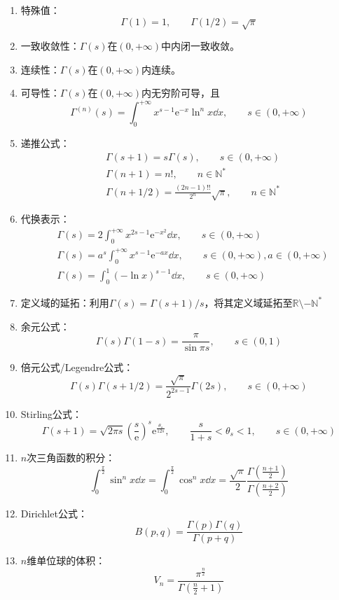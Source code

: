 \documentclass[lang = cn, scheme = chinese, thmcnt = section]{elegantbook}
\newcommand{\N}{\mathbb{N}}            %
\newcommand{\R}{\mathbb{R}}            %
\newcommand{\ee}[1]{\mathrm{e}^{#1}}
\begin{document}
\begin{theorem}
	\begin{enumerate}
		\item 特殊值：
		$$
		\Gamma(1)=1,\qquad 
		\Gamma(1/2)=\sqrt{\pi}
		$$
		\item 一致收敛性：$\Gamma(s)$在$(0,+\infty)$中内闭一致收敛。
		\item 连续性：$\Gamma(s)$在$(0,+\infty)$内连续。
		\item 可导性：$\Gamma(s)$在$(0,+\infty)$内无穷阶可导，且
		$$
		\Gamma^{(n)}(s)=\int_{0}^{+\infty}x^{s-1}\ee{-x}\ln^n x\dd x,\qquad s\in(0,+\infty)
		$$
		\item 递推公式：
		\begin{align*}
			& \Gamma(s+1)=s\Gamma(s),\qquad s\in(0,+\infty)\\
			& \Gamma(n+1)=n!,\qquad n\in\N^*\\
			& \Gamma(n+1/2)=\frac{(2n-1)!!}{2^n}\sqrt{\pi},\qquad n\in\N^*
		\end{align*}
		\item 代换表示：
		\begin{align*}
			& \Gamma(s)=2\int_{0}^{+\infty}x^{2s-1}\ee{-x^2}\dd x,\qquad s\in(0,+\infty)\\
			& \Gamma(s)=a^s\int_{0}^{+\infty}x^{s-1}\ee{-ax}\dd x,\qquad s\in(0,+\infty),a\in(0,+\infty)\\
			& \Gamma(s)=\int_{0}^{1}(-\ln x)^{s-1}\dd x,\qquad s\in(0,+\infty)
		\end{align*}
		\item 定义域的延拓：利用$\Gamma(s)=\Gamma(s+1)/s$，将其定义域延拓至$\R\setminus-\N^*$
		\item 余元公式：
		$$
		\Gamma(s)\Gamma(1-s)=\frac{\pi}{\sin \pi s},\qquad 
		s\in (0,1)
		$$
		\item 倍元公式/Legendre公式：
		$$
		\Gamma(s)\Gamma(s+1/2)
		=\frac{\sqrt{\pi}}{2^{2s-1}}\Gamma(2s),\qquad s\in(0,+\infty)
		$$
		\item Stirling公式：
		$$
		\Gamma(s+1)=\sqrt{2\pi s}\left(\frac{s}{\mathrm{e}}\right)^{s}\ee{\frac{\theta_s}{12s}},\qquad \frac{s}{1+s}<\theta_s<1,\qquad s\in(0,+\infty)
		$$
		\item $n$次三角函数的积分：
		$$
		\int_{0}^{\frac{\pi}{2}}\sin^n x\dd x
		=\int_{0}^{\frac{\pi}{2}}\cos^n x\dd x
		=\frac{\sqrt{\pi}}{2}\frac{\Gamma\left(\frac{n+1}{2}\right)}{\Gamma\left(\frac{n+2}{2}\right)}
		$$
		\item Dirichlet公式：
		$$
		B(p,q)=\frac{\Gamma(p)\Gamma(q)}{\Gamma(p+q)}
		$$
		\item $n$维单位球的体积：
		$$
		V_n=\frac{\pi^{\frac{n}{2}}}{\Gamma\left(\frac{n}{2}+1\right)}
		$$	
	\end{enumerate}
\end{theorem}
\end{document}

